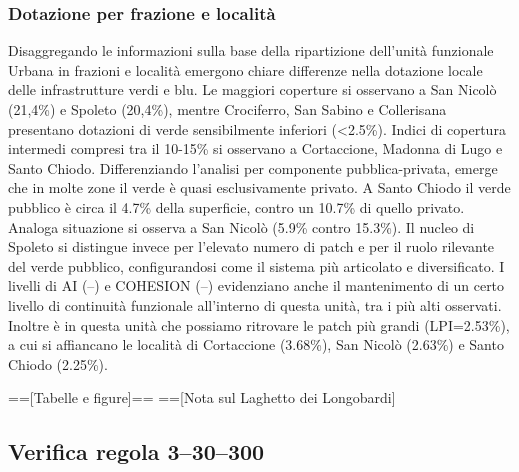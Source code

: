 \documentclass[
  a4paper,
]{book}
\begin{document}
\subsubsection{Dotazione per frazione e località}\label{dotazione-per-frazione-e-localituxe0}

Disaggregando le informazioni sulla base della ripartizione dell'unità funzionale Urbana in frazioni e località emergono chiare differenze nella dotazione locale delle infrastrutture verdi e blu.
Le maggiori coperture si osservano a San Nicolò (21,4\%) e Spoleto (20,4\%), mentre Crociferro, San Sabino e Collerisana presentano dotazioni di verde sensibilmente inferiori (\textless2.5\%).
Indici di copertura intermedi compresi tra il 10-15\% si osservano a Cortaccione, Madonna di Lugo e Santo Chiodo.
Differenziando l'analisi per componente pubblica-privata, emerge che in molte zone il verde è quasi esclusivamente privato.
A Santo Chiodo il verde pubblico è circa il 4.7\% della superficie, contro un 10.7\% di quello privato.
Analoga situazione si osserva a San Nicolò (5.9\% contro 15.3\%).
Il nucleo di Spoleto si distingue invece per l'elevato numero di patch e per il ruolo rilevante del verde pubblico, configurandosi come il sistema più articolato e diversificato.
I livelli di AI (--) e COHESION (--) evidenziano anche il mantenimento di un certo livello di continuità funzionale all'interno di questa unità, tra i più alti osservati.
Inoltre è in questa unità che possiamo ritrovare le patch più grandi (LPI=2.53\%), a cui si affiancano le località di Cortaccione (3.68\%), San Nicolò (2.63\%) e Santo Chiodo (2.25\%).

=={[}Tabelle e figure{]}==
=={[}Nota sul Laghetto dei Longobardi{]}

\subsection{Verifica regola 3--30--300}\label{verifica-regola-330300}
\end{document}
